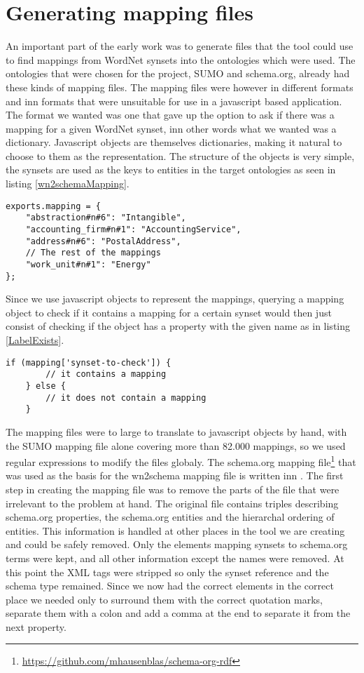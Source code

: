 \section{Generating mapping files}
An important part of the early work was to generate files that the tool could use to find mappings from WordNet synsets
into the ontologies which were used.
The ontologies that were chosen for the project, SUMO  and schema.org, already had these kinds of mapping files.
The mapping files were however in different formats and inn formats that were unsuitable for use in a javascript based application.
The format we wanted was one that gave up the option to ask if there was a mapping for a given WordNet synset,
inn other words what we wanted was a dictionary.
Javascript objects are themselves dictionaries, making it natural to choose to them as the representation.
The structure of the objects is very simple,
the synsets are used as the keys to entities in the target ontologies as seen in listing \ref{wn2schemaMapping}.

\begin{lstlisting}[label=wn2schemaMapping, caption={Excerpt from the \href{https://github.com/EivindEE/Madame/blob/master/mappings/wn2schema.js}{wn2schema.js} mapping file}]
exports.mapping = {
	"abstraction#n#6": "Intangible",
	"accounting_firm#n#1": "AccountingService",
	"address#n#6": "PostalAddress",
	// The rest of the mappings
	"work_unit#n#1": "Energy"
};
\end{lstlisting}

Since we use javascript objects to represent the mappings,
querying a mapping object to check if it contains a mapping for a certain synset would then just consist of checking if
the object has a property with the given name as in listing \ref{LabelExists}.
\begin{lstlisting}[label=LabelExists,caption=Testing if a mapping exists]
	if (mapping['synset-to-check']) {
		// it contains a mapping
	} else {
		// it does not contain a mapping
	}
\end{lstlisting}

The mapping files were to large to translate to javascript objects by hand, with the SUMO mapping file alone
covering more than 82.000 mappings, so we used regular expressions to modify the files globaly.
The schema.org mapping file\footnote{\url{https://github.com/mhausenblas/schema-org-rdf}}
that was used as the basis for the wn2schema mapping file is written inn .
The first step in creating the mapping file was to remove the parts of the file that were irrelevant to the problem at hand.
The original file contains triples describing schema.org properties,
the schema.org entities and the hierarchal ordering of entities.
This information is handled at other places in the tool we are creating and could be safely removed.
Only the elements mapping synsets to schema.org terms were kept, and all other information except the names were removed.
At this point the XML tags were stripped so only the synset reference and the schema type remained.
Since we now had the correct elements in the correct place we needed only to surround them with the correct quotation
marks, separate them with a colon and add a comma at the end to separate it from the next property.

